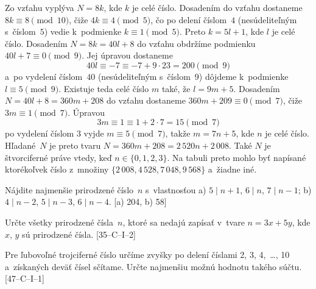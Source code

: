 {Zo vzťahu  vyplýva $N=8k$, kde $k$ je celé číslo. Dosadením do vzťahu  dostaneme $8k\equiv 8 \pmod{10}$, čiže $4k\equiv 4\pmod{5}$, čo po delení číslom~$4$ (nesúdeliteľným s~číslom~$5$) vedie k~podmienke $k\equiv 1 \pmod{5}$. Preto $k=5l+1$, kde $l$ je celé číslo. Dosadením $N=8k=40l+8$ do vzťahu  obdržíme podmienku  $40l+7\equiv 0\pmod{9}$. Jej úpravou dostaneme
$$
40l\equiv-7\equiv-7+9\cdot23=200\pmod{9}
$$
a~po vydelení číslom~$40$ (nesúdeliteľným s~číslom~$9$) dôjdeme k~podmienke $l\equiv 5\pmod9$. Existuje teda
celé číslo $m$ také, že $l=9m+5$. Dosadením $N=40l+8=360m+208$ do vzťahu  dostaneme $360m+209\equiv 0\pmod7$, čiže $3m\equiv1\pmod7$. Úpravou
$$
3m\equiv1\equiv1+2\cdot7=15\pmod7
$$
po vydelení číslom $3$ vyjde $m\equiv5\pmod 7$, takže $m=7n+5$, kde $n$ je celé číslo. Hľadané~$N$ je preto tvaru
$N=360m+208=2\,520n+2\,008$. Také $N$ je štvorciferné práve vtedy, keď $n\in\{0,1,2,3\}$. Na tabuli preto mohlo byť
napísané ktorékoľvek číslo z~množiny $\{2\,008, 4\,528, 7\,048, 9\,568\}$ a~žiadne iné.


Nájdite najmenšie prirodzené číslo~$n$ s~vlastnosťou a) $5\mid n+1$, $6\mid n$, $7\mid n-1$; b) $4\mid n-2$, $5\mid n-3$, $6\mid n-4$.
[a) 204, b) 58]

Určte všetky prirodzené čísla~$n$, ktoré sa nedajú zapísať v~tvare $n=3x+5y$, kde $x$, $y$ sú prirodzené čísla.
[35--C--I--2]

\D
Pre ľubovoľné trojciferné číslo určíme zvyšky po delení číslami 2, 3, 4,~\dots, 10 a~získaných deväť čísel sčítame. Určte najmenšiu možnú hodnotu takého súčtu. [47--C--I--1]
}

